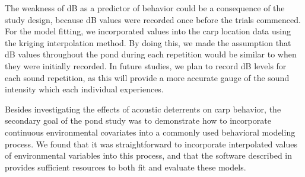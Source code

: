 \documentclass[12pt]{article}
\begin{document}
	The weakness of dB as a predictor of behavior could be a consequence of the study design, because dB values were recorded once before the trials commenced. For the model fitting, we incorporated values into the carp location data using the kriging interpolation method. By doing this, we made the assumption that dB values throughout the pond during each repetition would be similar to when they were initially recorded. In future studies, we plan to record dB levels for each sound repetition, as this will provide a more accurate gauge of the sound intensity which each individual experiences.
	
	Besides investigating the effects of acoustic deterrents on carp behavior, the secondary goal of the pond study was to demonstrate how to incorporate continuous environmental covariates into a commonly used behavioral modeling process. We found that it was straightforward to incorporate interpolated values of environmental variables into this process, and that the software described in \cite{McClintock2018} provides sufficient resources to both fit and evaluate these models.
	
	
	
	
\end{document}
